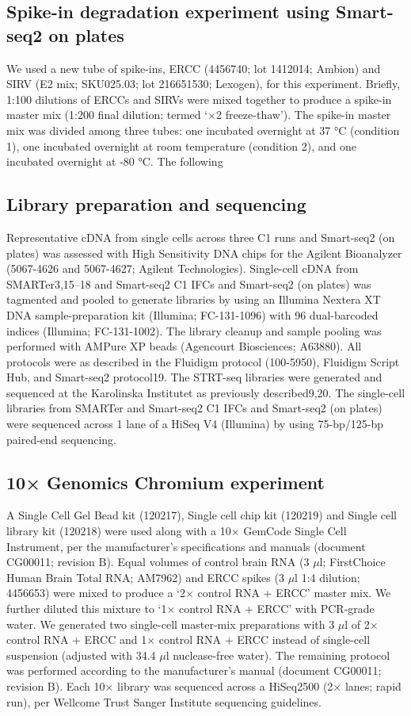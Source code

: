 \subsection{Spike-in degradation experiment using Smart-seq2 on plates}

We used a new tube of spike-ins, ERCC (4456740; lot 1412014; Ambion) and SIRV (E2 mix; SKU025.03; lot 216651530; Lexogen), for this experiment. Briefly, 1:100 dilutions of ERCCs and SIRVs were mixed together to produce a spike-in master mix (1:200 final dilution; termed ‘×2 freeze-thaw’). The spike-in master mix was divided among three tubes: one incubated overnight at 37 °C (condition 1), one incubated overnight at room temperature (condition 2), and one incubated overnight at -80 °C. The following

\subsection{Library preparation and sequencing}

Representative cDNA from single cells across three C1 runs and Smart-seq2 (on plates) was assessed with High Sensitivity DNA chips for the Agilent Bioanalyzer (5067-4626 and 5067-4627; Agilent Technologies). Single-cell cDNA from SMARTer3,15–18 and Smart-seq2 C1 IFCs and Smart-seq2 (on plates) was tagmented and pooled to generate libraries by using an Illumina Nextera XT DNA sample-preparation kit (Illumina; FC-131-1096) with 96 dual-barcoded indices (Illumina; FC-131-1002). The library cleanup and sample pooling was performed with AMPure XP beads (Agencourt Biosciences; A63880). All protocols were as described in the Fluidigm protocol (100-5950), Fluidigm Script Hub, and Smart-seq2 protocol19. The STRT-seq libraries were generated and sequenced at the Karolinska Institutet as previously described9,20. The single-cell libraries from SMARTer and Smart-seq2 C1 IFCs and Smart-seq2 (on plates) were sequenced across 1 lane of a HiSeq V4 (Illumina) by using 75-bp/125-bp paired-end sequencing.

\subsection{10× Genomics Chromium experiment}

A Single Cell Gel Bead kit (120217), Single cell chip kit (120219) and Single cell library kit (120218) were used along with a 10× GemCode Single Cell Instrument, per the manufacturer’s specifications and manuals (document CG00011; revision B). Equal volumes of control brain RNA (3 \( \mu \)l; FirstChoice Human Brain Total RNA; AM7962) and ERCC spikes (3 \( \mu \)l 1:4 dilution; 4456653) were mixed to produce a ‘2× control RNA + ERCC’ master mix. We further diluted this mixture to ‘1× control RNA + ERCC’ with PCR-grade water. We generated two single-cell master-mix preparations with 3 \( \mu \)l of 2× control RNA + ERCC and 1× control RNA + ERCC instead of single-cell suspension (adjusted with 34.4 \( \mu \)l nuclease-free water). The remaining protocol was performed according to the manufacturer’s manual (document CG00011; revision B). Each 10× library was sequenced across a HiSeq2500 (2× lanes; rapid run), per Wellcome Trust Sanger Institute sequencing guidelines.


